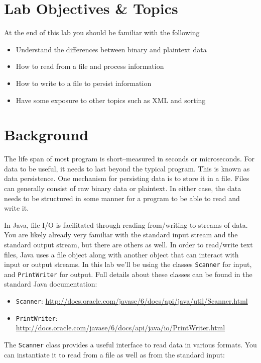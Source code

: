\documentclass[12pt]{scrartcl}
\begin{document}
\section{Lab Objectives \& Topics}
At the end of this lab you should be familiar with the following
\begin{itemize}
  \item Understand the differences between binary and plaintext data
  \item How to read from a file and process information
  \item How to write to a file to persist information
  \item Have some exposure to other topics such as XML and sorting
\end{itemize}

\section{Background}

The life span of most program is short--measured in seconds or 
microseconds.  For data to be useful, it needs to last beyond the 
typical program.  This is known as data persistence.  One mechanism 
for persisting data is to store it in a file.  Files can generally consist 
of raw binary data or plaintext.  In either case, the data needs to be 
structured in some manner for a program to be able to read and write 
it.

In Java, file I/O is facilitated through reading from/writing to streams 
of data.  You are likely already very familiar with the standard input 
stream and the standard output stream, but there are others as well.  
In order to read/write text files, Java uses a file object along with 
another object that can interact with input or output streams.  In 
this lab we'll be using the classes \texttt{Scanner} for 
input, and \texttt{PrintWriter} for output.  Full details 
about these classes can be found in the standard Java documentation:
\begin{itemize}
  \item \texttt{Scanner}: \url{http://docs.oracle.com/javase/6/docs/api/java/util/Scanner.html}
  \item \texttt{PrintWriter}: \url{http://docs.oracle.com/javase/6/docs/api/java/io/PrintWriter.html}
\end{itemize}

The \texttt{Scanner} class provides a useful interface to read 
data in various formats.  You can instantiate it to read from a file as well 
as from the standard input:
\end{document}
